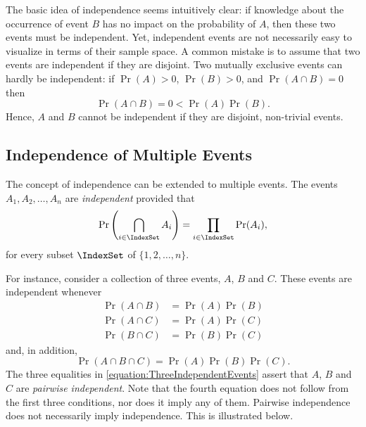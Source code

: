 The basic idea of independence seems intuitively clear: if knowledge about the occurrence of event $B$ has no impact on the probability of $A$, then these two events must be independent.
Yet, independent events are not necessarily easy to visualize in terms of their sample space.
A common mistake is to assume that two events are independent if they are disjoint.
Two mutually exclusive events can hardly be independent: if $\Pr (A) > 0$, $\Pr (B) > 0$, and $\Pr (A \cap B) = 0$ then
\begin{equation*}
\Pr (A \cap B) = 0 < \Pr (A) \Pr(B).
\end{equation*}
Hence, $A$ and $B$ cannot be independent if they are disjoint, non-trivial events.


\subsection{Independence of Multiple Events}

The concept of independence can be extended to multiple events.
The events $A_1, A_2, \ldots, A_n$ are \emph{independent} provided that 
\begin{equation} \label{equation:IndependenceMultipleEvents}
\Pr \left( \bigcap_{i \in \IndexSet} A_i \right)
= \prod_{i \in \IndexSet} \Pr (A_i) ,
\end{equation}
for every subset $\IndexSet$ of $\{1, 2, \ldots, n\}$.

For instance, consider a collection of three events, $A$, $B$ and $C$.
These events are independent whenever
\begin{equation} \label{equation:ThreeIndependentEvents}
\begin{split}
\Pr (A \cap B) &= \Pr (A) \Pr (B) \\
\Pr (A \cap C) &= \Pr (A) \Pr (C) \\
\Pr (B \cap C) &= \Pr (B) \Pr (C)
\end{split}
\end{equation}
and, in addition,
\begin{equation*}
\Pr (A \cap B \cap C) = \Pr (A) \Pr (B) \Pr(C) .
\end{equation*}
The three equalities in \eqref{equation:ThreeIndependentEvents} assert that $A$, $B$ and $C$ are \emph{pairwise independent}.
Note that the fourth equation does not follow from the first three conditions, nor does it imply any of them.
Pairwise independence does not necessarily imply independence.
This is illustrated below.

